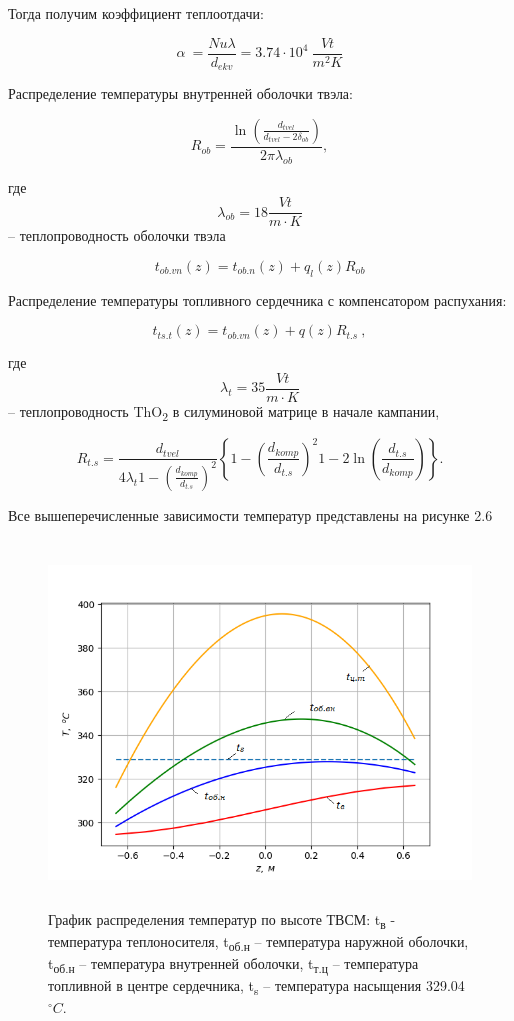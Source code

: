 Тогда получим коэффициент теплоотдачи:

\[\alpha\  = \frac{Nu\lambda}{d_{ekv}} = 3.74 \cdot 10^{4}\ \frac{Vt}{m^{2}K}\]

Распределение температуры внутренней оболочки твэла:

\[R_{ob} = \frac{\ln\left( \frac{d_{tvel}}{d_{tvel} - 2\delta_{ob}} \right)}{2\pi\lambda_{ob}},\]

где \[\lambda_{ob} = 18\frac{Vt}{m \cdot K}\] -- теплопроводность
оболочки твэла

\[t_{ob.vn}\left( z \right) = t_{ob.n}\left( z \right) + q_{l}\left( z \right)R_{ob}\]


Распределение температуры топливного сердечника с компенсатором
распухания:

\[t_{ts.t}\left( z \right) = t_{ob.vn}\left( z \right) + q\left( z \right)R_{t.s}\ ,\]

где \[\lambda_{t} = 35\frac{Vt}{m \cdot K}\] -- теплопроводность
ThO\textsubscript{2} в силуминовой матрице в начале кампании,

\[R_{t.s} = \frac{d_{tvel}}{4\lambda_{t} 1 - \left( \frac{d_{komp}}{d_{t.s}} \right)^{2} }\left\{ 1 - \left( \frac{d_{komp}}{d_{t.s}} \right)^{2} 1 - 2\ln\left( \frac{d_{t.s}}{d_{komp}} \right)  \right\}.\]

Все вышеперечисленные зависимости температур представлены на рисунке 2.6

\begin{figure}[!h]
\center
\includegraphics[width=5.11811in,height=3.80712in]{media/image10.png}
\caption{График распределения температур по высоте ТВСМ:
t­\textsubscript{в} - температура теплоносителя, t­\textsubscript{об.н}
-- температура наружной оболочки, t­\textsubscript{об.н} -- температура
внутренней оболочки, t­\textsubscript{т.ц} -- температура топливной в
центре сердечника, t­\textsubscript{s} -- температура насыщения 329.04
$^\circ C$.}
\end{figure}

